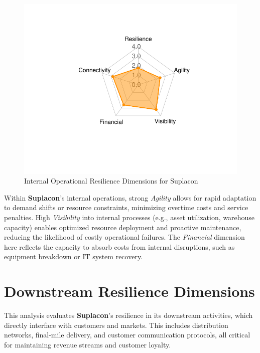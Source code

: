 \documentclass[
  oneside,
  open=any,
  fontsize=11pt]{scrbook}
\begin{document}
\begin{figure}[H]

{\centering \includegraphics[width=0.8\linewidth,height=\textheight,keepaspectratio]{example_3_files/figure-pdf/internal-radar-chart-1.pdf}

}

\caption{Internal Operational Resilience Dimensions for Suplacon}

\end{figure}%

Within \textbf{Suplacon}'s internal operations, strong \emph{Agility}
allows for rapid adaptation to demand shifts or resource constraints,
minimizing overtime costs and service penalties. High \emph{Visibility}
into internal processes (e.g., asset utilization, warehouse capacity)
enables optimized resource deployment and proactive maintenance,
reducing the likelihood of costly operational failures. The
\emph{Financial} dimension here reflects the capacity to absorb costs
from internal disruptions, such as equipment breakdown or IT system
recovery.

\section{Downstream Resilience
Dimensions}\label{downstream-resilience-dimensions}

This analysis evaluates \textbf{Suplacon}'s resilience in its downstream
activities, which directly interface with customers and markets. This
includes distribution networks, final-mile delivery, and customer
communication protocols, all critical for maintaining revenue streams
and customer loyalty.
\end{document}
